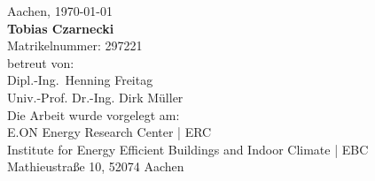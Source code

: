 \begin{titlepage}
\vfill
\begin{center}
\begingroup
{}\selectfont
Aachen, \today \\
\addvspace{0.5cm}
\textbf{Tobias Czarnecki} \\
Matrikelnummer: 297221 \\
\addvspace{0.5cm}
betreut von:\\
Dipl.-Ing.~Henning Freitag \\
Univ.-Prof. Dr.-Ing. Dirk Müller \\
\addvspace{0.5cm}
Die Arbeit wurde vorgelegt am:\\
E.ON Energy Research Center | ERC \\
Institute for Energy Efficient Buildings and Indoor Climate | EBC\\
Mathieustraße 10, 52074 Aachen\\
\endgroup
\end{center}

\end{titlepage}
